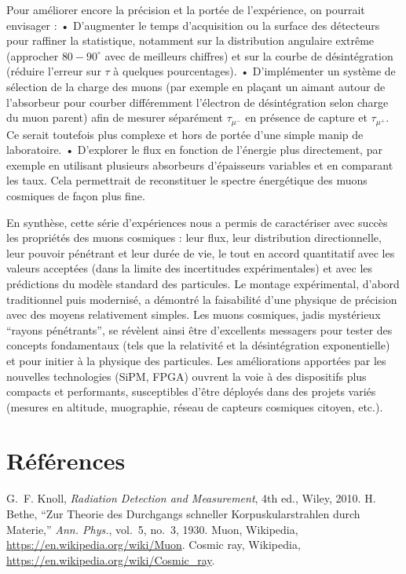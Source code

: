 \documentclass[a4paper,12pt,twoside]{article}
\begin{document}
Pour améliorer encore la précision et la portée de l’expérience, on pourrait envisager :
	•	D’augmenter le temps d’acquisition ou la surface des détecteurs pour raffiner la statistique, notamment sur la distribution angulaire extrême (approcher $80-90^\circ$ avec de meilleurs chiffres) et sur la courbe de désintégration (réduire l’erreur sur $\tau$ à quelques pourcentages).
	•	D’implémenter un système de sélection de la charge des muons (par exemple en plaçant un aimant autour de l’absorbeur pour courber différemment l’électron de désintégration selon charge du muon parent) afin de mesurer séparément $\tau_{\mu^-}$ en présence de capture et $\tau_{\mu^+}$. Ce serait toutefois plus complexe et hors de portée d’une simple manip de laboratoire.
	•	D’explorer le flux en fonction de l’énergie plus directement, par exemple en utilisant plusieurs absorbeurs d’épaisseurs variables et en comparant les taux. Cela permettrait de reconstituer le spectre énergétique des muons cosmiques de façon plus fine.

En synthèse, cette série d’expériences nous a permis de caractériser avec succès les propriétés des muons cosmiques : leur flux, leur distribution directionnelle, leur pouvoir pénétrant et leur durée de vie, le tout en accord quantitatif avec les valeurs acceptées (dans la limite des incertitudes expérimentales) et avec les prédictions du modèle standard des particules. Le montage expérimental, d’abord traditionnel puis modernisé, a démontré la faisabilité d’une physique de précision avec des moyens relativement simples. Les muons cosmiques, jadis mystérieux “rayons pénétrants”, se révèlent ainsi être d’excellents messagers pour tester des concepts fondamentaux (tels que la relativité et la désintégration exponentielle) et pour initier à la physique des particules. Les améliorations apportées par les nouvelles technologies (SiPM, FPGA) ouvrent la voie à des dispositifs plus compacts et performants, susceptibles d’être déployés dans des projets variés (mesures en altitude, muographie, réseau de capteurs cosmiques citoyen, etc.).

\section*{Références}
\begin{thebibliography}{9}
 G.~F. Knoll, \emph{Radiation Detection and Measurement}, 4th ed., Wiley, 2010.
 H. Bethe, ``Zur Theorie des Durchgangs schneller Korpuskularstrahlen durch Materie,'' \emph{Ann. Phys.}, vol.~5, no.~3, 1930.
 Muon, Wikipedia, \url{https://en.wikipedia.org/wiki/Muon}.
 Cosmic ray, Wikipedia, \url{https://en.wikipedia.org/wiki/Cosmic_ray}.
\end{thebibliography}
\end{document}
